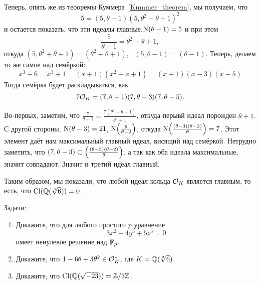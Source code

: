 \begin{example}
 	    Теперь, опять же из теооремы Куммера~\ref{Kummer_theorem}, мы получаем, что 
 	    \[
 	     	5 = (5, \theta - 1)(5, \theta^2 + \theta + 1)^2
 	     \] 
 	     и остается показать, что эти идеалы главные.$\Nm(\theta - 1) = 5$ и при этом 
 	     \[
 	     	\frac{5}{\theta - 1} = \theta^2 + \theta + 1, 
 	     \]
 	     откуда $(5, \theta^2 + \theta + 1) = (\theta^2 + \theta + 1)$, \ $(5, \theta - 1) = (\theta - 1)$.  Теперь, делаем то же самое над семёркой: 
 	     \[
 	     	x^3 - 6 = x^3 + 1 = (x + 1)(x^2 - x + 1) = (x + 1)(x - 3)(x - 5)
 	     \]
 	     Тогда семёрка будет раскладываться, как 
 	     \[
 	     	7\cO_{K} = (7, \theta + 1) (7, \theta - 3)(7, \theta - 5).
 	     \]

 	     Во-первых, заметим, что $\frac{7}{\theta + 1} = \frac{7(\theta^2 - \theta + 1)}{\theta^3 + 1}$, откуда перывй идеал порожден $\theta + 1$. С другой стороны, $\Nm(\theta - 3) = 21$, $\Nm\lr*{\frac{\theta}{\theta - 2}}$, откуда $\Nm\lr*{\frac{(\theta - 3)(\theta - 2)}{\theta}} = 7$. Этот элемент даёт нам максимальный главный идеал, висящий над семёркой. Нетрудно заметить, что $(7, \theta - 3) \subset \lr*{\frac{(\theta - 3)(\theta - 2)}{\theta}}$, а так как оба идеала максимальные, значит совпадают. Значит и третий идеал главный. 

 	     Таким образом, мы показали, что любой идеал кольца $\cO_{K}$ является главным, то есть, что $\Cl(\Q(\sqrt[3]{6})) = 0$.
 	  \end{example}

 	  \begin{homework}\label{hw:10}
 	  	Задачи: 
 	  	\begin{enumerate}
 	  		\item Докажите, что для любого простого $p$ уравнение  
 	  		\[
 	  			3x^2 + 4y^3 + 5z^3 = 0
 	  		\]
 	  		имеет ненулевое решение над $\F_{p}$.
 	  		\item Докажите, что $1 - 6\theta + 3\theta^2 \in \cO_{K}^{*}$, где $K = \Q(\sqrt[3]{6})$.

 	  		\item Докажите, что $\Cl(\Q(\sqrt{-23})) = \Z/3\Z$.
 	  	\end{enumerate}
 	  \end{homework}













